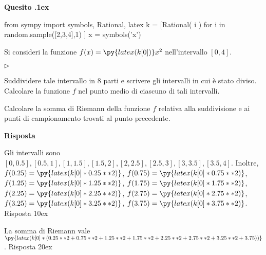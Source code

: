 \documentclass[11pt,twoside,a4paper]{article}
\newcommand{\mylabel}[1]{#1\hfill}
\renewenvironment{itemize}
  {\begin{list}{$\triangleright$}{%
   \setlength{\parskip}{0mm}
   \setlength{\topsep}{.4\baselineskip}
   \setlength{\rightmargin}{0mm}
   \setlength{\listparindent}{0mm}
   \setlength{\itemindent}{0mm}
   \setlength{\labelwidth}{2ex}
   \setlength{\itemsep}{.4\baselineskip}
   \setlength{\parsep}{0mm}
   \setlength{\partopsep}{0mm}
   \setlength{\labelsep}{1ex}
   \setlength{\leftmargin}{\labelwidth+\labelsep}
   \let\makelabel\mylabel}}{%
   \end{list}\vspace*{-1.3mm}}
\newcounter{quesito}
\newenvironment{question}{\bigskip\addtocounter{quesito}{1}\bigskip\bigskip\par\textbf{Quesito \thequesito.\kern1ex}}{\vspace{\parskip}}
\newenvironment{answer}{\par\textbf{Risposta\quad}}{\vspace{\parskip}}
\begin{document}
\begin{question}
\begin{pycode}
from sympy import  symbols, Rational, latex
k = [Rational( i ) for i in random.sample([2,3,4],1) ]
x = symbols('x')
\end{pycode}
Si consideri la funzione $f(x) = \py{latex(k[0])}x^2$ nell'intervallo $[0,4]$.
\begin{itemize}
\item[1.] Suddividere tale intervallo in $8$ parti e scrivere gli intervalli in cui \`e stato diviso. Calcolare la funzione $f$ nel punto medio di ciascuno di tali intervalli.
\item[2.] Calcolare la somma di Riemann della funzione $f$ relativa alla suddivisione e ai punti di campionamento trovati al punto precedente.
\end{itemize}
\begin{answer}

{\color{blue}
Gli intervalli sono $[0, 0.5], [0.5, 1], [1, 1.5], [1.5, 2], [2, 2.5], [2.5, 3], [3, 3.5], [3.5, 4]$.
Inoltre, $f(0.25) = \py{latex(k[0]*0.25**2)}$, $f(0.75) = \py{latex(k[0]*0.75**2)}$, $f(1.25) = \py{latex(k[0]*1.25**2)}$, $f(1.75) = \py{latex(k[0]*1.75**2)}$, $f(2.25) = \py{latex(k[0]*2.25**2)}$, $f(2.75) = \py{latex(k[0]*2.75**2)}$, $f(3.25) = \py{latex(k[0]*3.25**2)}$, $f(3.75) = \py{latex(k[0]*3.75**2)}$.
\hfill Risposta 1\kern0ex}


\medskip
{\color{blue}La somma di Riemann vale $\py{latex(k[0]*(0.25**2+0.75**2+1.25**2+1.75**2+2.25**2+2.75**2+3.25**2+3.75))}$.
\hfill Risposta 2\kern0ex}

\end{answer}
\end{question}
\end{document}
